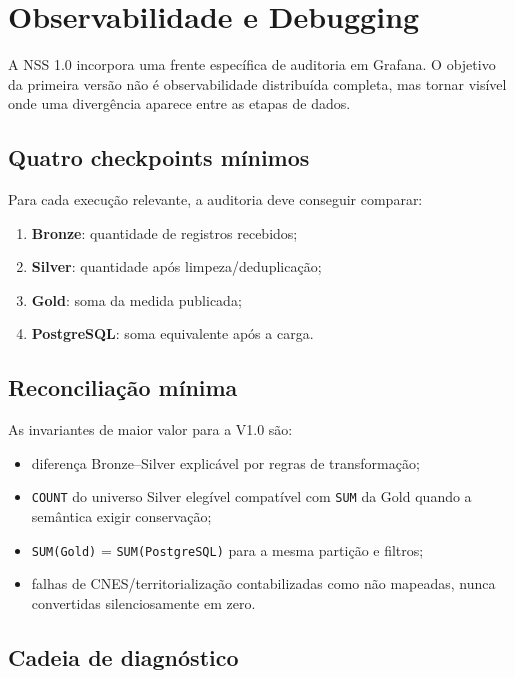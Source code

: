 \section{Observabilidade e Debugging}

A NSS 1.0 incorpora uma frente específica de auditoria em Grafana. O objetivo da primeira versão não é observabilidade distribuída completa, mas tornar visível onde uma divergência aparece entre as etapas de dados.

\subsection{Quatro checkpoints mínimos}

Para cada execução relevante, a auditoria deve conseguir comparar:

\begin{enumerate}
    \item \textbf{Bronze}: quantidade de registros recebidos;
    \item \textbf{Silver}: quantidade após limpeza/deduplicação;
    \item \textbf{Gold}: soma da medida publicada;
    \item \textbf{PostgreSQL}: soma equivalente após a carga.
\end{enumerate}

\subsection{Reconciliação mínima}

As invariantes de maior valor para a V1.0 são:

\begin{itemize}
    \item diferença Bronze--Silver explicável por regras de transformação;
    \item \texttt{COUNT} do universo Silver elegível compatível com \texttt{SUM} da Gold quando a semântica exigir conservação;
    \item \texttt{SUM(Gold)} = \texttt{SUM(PostgreSQL)} para a mesma partição e filtros;
    \item falhas de CNES/territorialização contabilizadas como não mapeadas, nunca convertidas silenciosamente em zero.
\end{itemize}

\subsection{Cadeia de diagnóstico}

